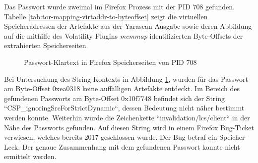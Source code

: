 \begin{table}[h!]
	\centering
	\caption{Tor-Browser: Abbildung der virtuellen Speicheradressen der gefundenen Strings im RAM auf Byte-Offsets der entsprechenden Speicherseiten}
	\label{tab:tor-mapping-virtaddr-to-byteoffset}
\end{table}

Das Passwort wurde zweimal im Firefox Prozess mit der PID 708 gefunden. Tabelle \ref{tab:tor-mapping-virtaddr-to-byteoffset} zeigt die virtuellen Speicheradressen der Artefakte aus der Yarascan Ausgabe sowie deren Abbildung auf die mithilfe des Volatility Plugins \textit{memmap} identifizierten Byte-Offsets der extrahierten Speicherseiten.


\begin{figure}[h!]
	\centering
	\hfill
	\caption{Passwort-Klartext in Firefox Speicherseiten von PID 708}
	\label{img:firefox-pw-offset-pid-708}  
\end{figure}
Bei Untersuchung des String-Kontexts in Abbildung \ref{img:firefox-pw-offset-pid-708}, wurden für das Passwort am Byte-Offset 0xea0318 keine auffälligen Artefakte entdeckt.
Im Bereich des gefundenen Passworts am Byte-Offset 0x10f7748 befindet sich der String ``CSP\_ignoringSrcForStrictDynamic``, dessen Bedeutung nicht näher bestimmt werden konnte.
Weiterhin wurde die Zeichenkette ``invalidation/lcs/client`` in der Nähe des Passworts gefunden. Auf diesen String wird in einem Firefox Bug-Ticket verwiesen, welches bereits 2017 geschlossen wurde. Der Bug betraf ein Speicher-Leck. \cite{Bugzilla.05.06.2023} Der genaue Zusammenhang mit dem gefundenen Passwort konnte nicht ermittelt werden. 
	
